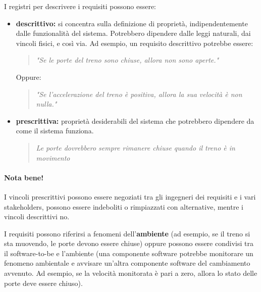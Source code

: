 \documentclass[italian]{article}
\begin{document}
	I registri per descrivere i requisiti possono essere:
	\begin{itemize}
		\item \textbf{descrittivo:} si concentra sulla definizione di proprietà, indipendentemente dalle funzionalità del sistema. Potrebbero dipendere dalle leggi naturali, dai vincoli fisici, e così via. Ad esempio, un requisito descrittivo potrebbe essere:
		\begin{quotation}
			\textit{"Se le porte del treno sono chiuse, allora non sono aperte."}
		\end{quotation}
		Oppure:
		\begin{quotation}
			\textit{"Se l'accelerazione del treno è positiva, allora la sua velocità è non nulla."}
		\end{quotation}
		\item \textbf{prescrittiva:} proprietà desiderabili del sistema che potrebbero dipendere da come il sistema funziona.
		\begin{quotation}
			\textit{Le porte dovrebbero sempre rimanere chiuse quando il treno è in movimento}
		\end{quotation}
	\end{itemize}
	\paragraph{\textbf{Nota bene!}}I vincoli prescrittivi possono essere negoziati tra gli ingegneri dei requisiti e i vari stakeholders, possono essere indeboliti o rimpiazzati con alternative, mentre i vincoli descrittivi no.

	I requisiti possono riferirsi a fenomeni dell'\textbf{ambiente} (ad esempio, se il treno si sta muovendo, le porte devono essere chiuse) oppure possono essere condivisi tra il software-to-be e l'ambiente (una componente software potrebbe monitorare un fenomeno ambientale e avvisare un'altra componente software del cambiamento avvenuto. Ad esempio, se la velocità monitorata è pari a zero, allora lo stato delle porte deve essere chiuso).
\end{document}
